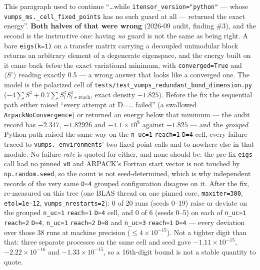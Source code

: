 \documentclass[11pt]{article}
\begin{document}
This paragraph used to continue ``\ldots while
\texttt{itensor\_version="python"} --- whose
\texttt{vumps\_ms.\_cell\_fixed\_points} has no such guard at all ---
returned the exact energy''. \textbf{Both halves of that were wrong}
(2026-09 audit, finding \#3), and the second is the instructive one:
having \emph{no} guard is not the same as being right. A bare
\texttt{eigs(k=1)} on a transfer matrix carrying a decoupled unimodular
block returns an arbitrary element of a degenerate eigenspace, and the
energy built on it came back \emph{below} the exact variational minimum,
with \texttt{converged=True} and $\langle S^z\rangle$ reading exactly
0.5 --- a wrong answer that looks like a converged one. The model is the
polarized cell of
\texttt{tests/test\_vumps\_redundant\_bond\_dimension.py}
($-4\sum S^z + 0.7\sum S^z_i S^z_{i+\mathrm{reach}}$, exact density
$-1.825$). Before the fix the sequential path either raised ``every
attempt at D=\ldots{} failed'' (a swallowed
\texttt{ArpackNoConvergence}) or returned an energy below that minimum
--- the audit record has $-2.347$, $-1.82926$ and $-1.1\times10^{8}$
against $-1.825$ --- and the \emph{grouped} Python path
raised the same way on the \texttt{n\_uc=1} \texttt{reach=1}
\texttt{D=4} cell, every failure traced to
\texttt{vumps.\_environments}' two fixed-point calls and to nowhere else
in that module. No failure \emph{rate} is quoted for either, and none
should be: the pre-fix \texttt{eigs} call had no pinned \texttt{v0} and
ARPACK's Fortran start vector is not touched by
\texttt{np.random.seed}, so the count is not seed-determined, which is
why independent records of the very same \texttt{D=4} grouped
configuration disagree on it. After the fix, re-measured on this tree
(one BLAS thread on one pinned core, \texttt{maxiter=300},
\texttt{etol=1e-12}, \texttt{vumps\_nrestarts=2}): 0 of 20 runs (seeds
0--19) raise or deviate on the grouped \texttt{n\_uc=1} \texttt{reach=1}
\texttt{D=4} cell, and 0 of 6 (seeds 0--5) on each of \texttt{n\_uc=1}
\texttt{reach=2} \texttt{D=4}, \texttt{n\_uc=1} \texttt{reach=2}
\texttt{D=8} and \texttt{n\_uc=3} \texttt{reach=1} \texttt{D=4} --- every
deviation over those 38 runs at machine precision ($\le 4\times10^{-15}$).
Not a tighter digit than that: three separate processes on the same cell
and seed gave $-1.11\times10^{-15}$, $-2.22\times10^{-16}$ and
$-1.33\times10^{-15}$, so a 16th-digit bound is not a stable quantity to
quote.
\end{document}
